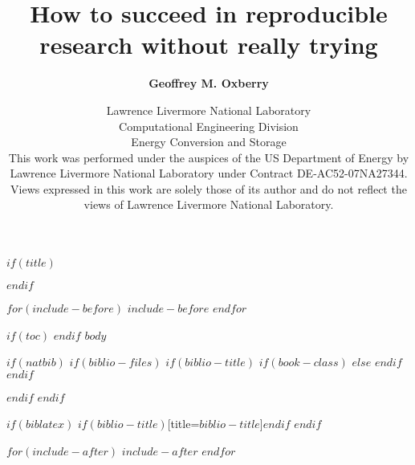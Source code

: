 \documentclass [12pt]{beamer}
\title[Reproducibility without trying]
{How to succeed in reproducible research without really trying}
\subtitle[G. Oxberry]
{\textbf{Geoffrey M. Oxberry}}
\author[]{\small{Lawrence Livermore National Laboratory \\
Computational Engineering Division \\
Energy Conversion and Storage} \\[2\baselineskip] 
\scriptsize{This work was performed under the auspices of the 
US Department of Energy by Lawrence Livermore National Laboratory
 under Contract DE-AC52-07NA27344. Views expressed in this work
are solely those of its author and do not reflect the views of Lawrence
Livermore National Laboratory.}}
\institute[LLNL-PRES-621574-DRAFT]
\begin{document}
$if(title)$
\maketitle
$endif$ %

$for(include-before)$
$include-before$
$endfor$ %

$if(toc)$
{
\hypersetup{linkcolor=black}
\setcounter{tocdepth}{$toc-depth$}
\tableofcontents
}
$endif$ %
$body$

$if(natbib)$
$if(biblio-files)$
$if(biblio-title)$
$if(book-class)$
\renewcommand\bibname{$biblio-title$}
$else$
\renewcommand\refname{$biblio-title$}
$endif$ %
$endif$ %

$endif$ %
$endif$ %

$if(biblatex)$
\printbibliography$if(biblio-title)$[title=$biblio-title$]$endif$
$endif$ %

$for(include-after)$
$include-after$
$endfor$ %
\end{document}
